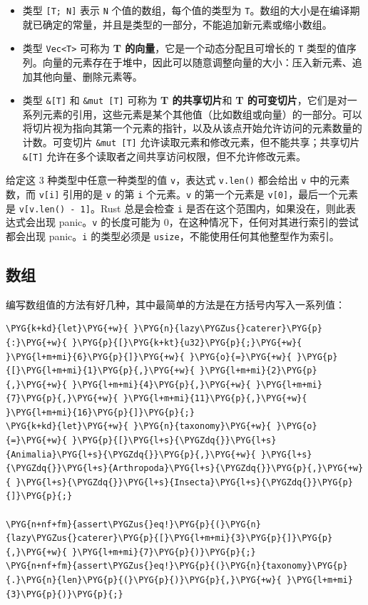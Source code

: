 \begin{itemize}
\item 类型 \texttt{[T; N]} 表示 \texttt{N} 个值的数组，每个值的类型为 \texttt{T}。数组的大小是在编译期就已确定的常量，并且是类型的一部分，不能追加新元素或缩小数组。
\item 类型 \texttt{Vec<T>} 可称为 \textbf{T 的向量}，它是一个动态分配且可增长的 \texttt{T} 类型的值序列。向量的元素存在于堆中，因此可以随意调整向量的大小：压入新元素、追加其他向量、删除元素等。
\item 类型 \texttt{\&[T]} 和 \texttt{\&mut [T]} 可称为 \textbf{T 的共享切片}和 \textbf{T 的可变切片}，它们是对一系列元素的引用，这些元素是某个其他值（比如数组或向量）的一部分。可以将切片视为指向其第一个元素的指针，以及从该点开始允许访问的元素数量的计数。可变切片 \texttt{\&mut [T]} 允许读取元素和修改元素，但不能共享；共享切片 \texttt{\&[T]} 允许在多个读取者之间共享访问权限，但不允许修改元素。
\end{itemize}

给定这 3 种类型中任意一种类型的值 \texttt{v}，表达式 \texttt{v.len()} 都会给出 \texttt{v} 中的元素数，而 \texttt{v[i]} 引用的是 \texttt{v} 的第 \texttt{i} 个元素。\texttt{v} 的第一个元素是 \texttt{v[0]}，最后一个元素是 \texttt{v[v.len() - 1]}。Rust 总是会检查 \texttt{i} 是否在这个范围内，如果没在，则此表达式会出现 panic。\texttt{v} 的长度可能为 0，在这种情况下，任何对其进行索引的尝试都会出现 panic。\texttt{i} 的类型必须是 \texttt{usize}，不能使用任何其他整型作为索引。

\subsection{数组}

编写数组值的方法有好几种，其中最简单的方法是在方括号内写入一系列值：

\begin{Verbatim}[commandchars=\\\{\},breaklines=true,breakanywhere=true,fontsize=\codefont,xleftmargin=17bp]
\PYG{k+kd}{let}\PYG{+w}{ }\PYG{n}{lazy\PYGZus{}caterer}\PYG{p}{:}\PYG{+w}{ }\PYG{p}{[}\PYG{k+kt}{u32}\PYG{p}{;}\PYG{+w}{ }\PYG{l+m+mi}{6}\PYG{p}{]}\PYG{+w}{ }\PYG{o}{=}\PYG{+w}{ }\PYG{p}{[}\PYG{l+m+mi}{1}\PYG{p}{,}\PYG{+w}{ }\PYG{l+m+mi}{2}\PYG{p}{,}\PYG{+w}{ }\PYG{l+m+mi}{4}\PYG{p}{,}\PYG{+w}{ }\PYG{l+m+mi}{7}\PYG{p}{,}\PYG{+w}{ }\PYG{l+m+mi}{11}\PYG{p}{,}\PYG{+w}{ }\PYG{l+m+mi}{16}\PYG{p}{]}\PYG{p}{;}
\PYG{k+kd}{let}\PYG{+w}{ }\PYG{n}{taxonomy}\PYG{+w}{ }\PYG{o}{=}\PYG{+w}{ }\PYG{p}{[}\PYG{l+s}{\PYGZdq{}}\PYG{l+s}{Animalia}\PYG{l+s}{\PYGZdq{}}\PYG{p}{,}\PYG{+w}{ }\PYG{l+s}{\PYGZdq{}}\PYG{l+s}{Arthropoda}\PYG{l+s}{\PYGZdq{}}\PYG{p}{,}\PYG{+w}{ }\PYG{l+s}{\PYGZdq{}}\PYG{l+s}{Insecta}\PYG{l+s}{\PYGZdq{}}\PYG{p}{]}\PYG{p}{;}

\PYG{n+nf+fm}{assert\PYGZus{}eq!}\PYG{p}{(}\PYG{n}{lazy\PYGZus{}caterer}\PYG{p}{[}\PYG{l+m+mi}{3}\PYG{p}{]}\PYG{p}{,}\PYG{+w}{ }\PYG{l+m+mi}{7}\PYG{p}{)}\PYG{p}{;}
\PYG{n+nf+fm}{assert\PYGZus{}eq!}\PYG{p}{(}\PYG{n}{taxonomy}\PYG{p}{.}\PYG{n}{len}\PYG{p}{(}\PYG{p}{)}\PYG{p}{,}\PYG{+w}{ }\PYG{l+m+mi}{3}\PYG{p}{)}\PYG{p}{;}
\end{Verbatim}

